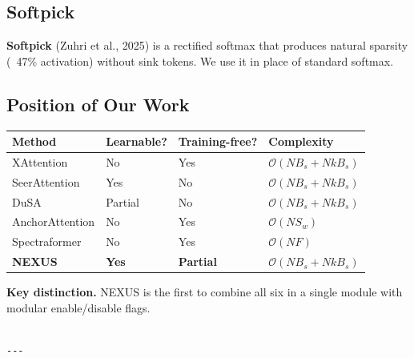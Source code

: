 \subsection{Softpick}

\textbf{Softpick} (Zuhri et al., 2025) is a rectified softmax that produces 
natural sparsity (~47\% activation) without sink tokens. We use it in place 
of standard softmax.

\subsection{Position of Our Work}

\begin{table}[H]
\centering
\small
\begin{tabular}{llll}
\toprule
\textbf{Method} & \textbf{Learnable?} & \textbf{Training-free?} & \textbf{Complexity} \\
\midrule
XAttention & No & Yes & $\mathcal{O}(N B_s + N k B_s)$ \\
SeerAttention & Yes & No & $\mathcal{O}(N B_s + N k B_s)$ \\
DuSA & Partial & No & $\mathcal{O}(N B_s + N k B_s)$ \\
AnchorAttention & No & Yes & $\mathcal{O}(N S_w)$ \\
Spectraformer & No & Yes & $\mathcal{O}(N F)$ \\
\textbf{NEXUS} & \textbf{Yes} & \textbf{Partial} & \textbf{$\mathcal{O}(N B_s + N k B_s)$} \\
\bottomrule
\end{tabular}
\end{table}

\textbf{Key distinction.} NEXUS is the first to combine all six in a single 
module with modular enable/disable flags.
\begin{lstlisting}

---
\end{lstlisting}